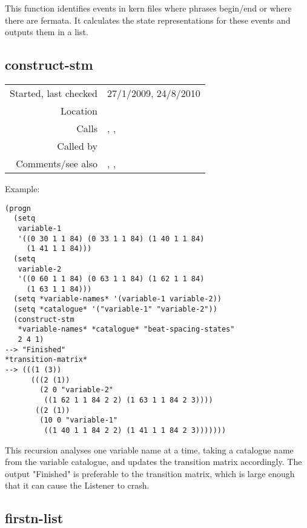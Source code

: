\noindent This function identifies events in kern files
where phrases begin/end or where there are fermata. It
calculates the state representations for these events
and outputs them in a list.


\subsection*{construct-stm}\label{fun:construct-stm}

\vspace{0.3cm}
\begin{tabular}{r|p{8cm}}
Started, last checked & 27/1/2009, 24/8/2010 \\
Location & \nameref{sec:markov-analyse} \\
Calls & \nameref{fun:beat-spacing-states}, \nameref{fun:markov-analyse}, \nameref{fun:spacing-holding-states} \\
Called by & \\
Comments/see also & \nameref{fun:construct-final-states}, \nameref{fun:construct-initial-states}, \nameref{fun:construct-stm<-}
\end{tabular}

\vspace{0.5cm}
\noindent Example:
\begin{verbatim}
(progn
  (setq
   variable-1
   '((0 30 1 1 84) (0 33 1 1 84) (1 40 1 1 84)
     (1 41 1 1 84)))
  (setq
   variable-2
   '((0 60 1 1 84) (0 63 1 1 84) (1 62 1 1 84)
     (1 63 1 1 84)))
  (setq *variable-names* '(variable-1 variable-2))
  (setq *catalogue* '("variable-1" "variable-2"))
  (construct-stm
   *variable-names* *catalogue* "beat-spacing-states"
   2 4 1)
--> "Finished"
*transition-matrix*
--> (((1 (3))
      (((2 (1))
        (2 0 "variable-2"
         ((1 62 1 1 84 2 2) (1 63 1 1 84 2 3))))
       ((2 (1))
        (10 0 "variable-1"
         ((1 40 1 1 84 2 2) (1 41 1 1 84 2 3)))))))
\end{verbatim}

\noindent This recursion analyses one variable name at
a time, taking a catalogue name from the variable
catalogue, and updates the transition matrix
accordingly. The output "Finished" is preferable to
the transition matrix, which is large enough that it
can cause the Listener to crash.


\subsection*{firstn-list}\label{fun:firstn-list}

